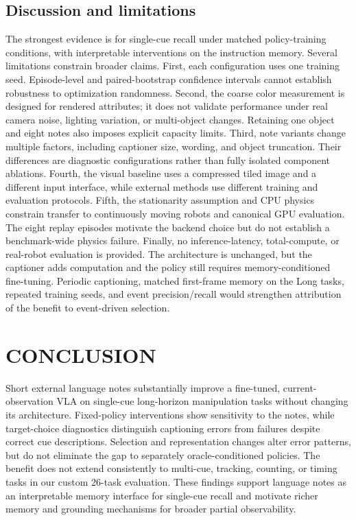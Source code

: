 \documentclass{IJCAS}
\begin{document}
\subsection{Discussion and limitations}
The strongest evidence is for single-cue recall under matched policy-training conditions, with interpretable interventions on the instruction memory.
Several limitations constrain broader claims.
First, each configuration uses one training seed. Episode-level and paired-bootstrap confidence intervals cannot establish robustness to optimization randomness.
Second, the coarse color measurement is designed for rendered attributes; it does not validate performance under real camera noise, lighting variation, or multi-object changes. Retaining one object and eight notes also imposes explicit capacity limits.
Third, note variants change multiple factors, including captioner size, wording, and object truncation. Their differences are diagnostic configurations rather than fully isolated component ablations.
Fourth, the visual baseline uses a compressed tiled image and a different input interface, while external methods use different training and evaluation protocols.
Fifth, the stationarity assumption and CPU physics constrain transfer to continuously moving robots and canonical GPU evaluation. The eight replay episodes motivate the backend choice but do not establish a benchmark-wide physics failure.
Finally, no inference-latency, total-compute, or real-robot evaluation is provided. The architecture is unchanged, but the captioner adds computation and the policy still requires memory-conditioned fine-tuning.
Periodic captioning, matched first-frame memory on the Long tasks, repeated training seeds, and event precision/recall would strengthen attribution of the benefit to event-driven selection.

\section{CONCLUSION}
Short external language notes substantially improve a fine-tuned, current-observation VLA on single-cue long-horizon manipulation tasks without changing its architecture.
Fixed-policy interventions show sensitivity to the notes, while target-choice diagnostics distinguish captioning errors from failures despite correct cue descriptions.
Selection and representation changes alter error patterns, but do not eliminate the gap to separately oracle-conditioned policies.
The benefit does not extend consistently to multi-cue, tracking, counting, or timing tasks in our custom 26-task evaluation.
These findings support language notes as an interpretable memory interface for single-cue recall and motivate richer memory and grounding mechanisms for broader partial observability.
\end{document}
